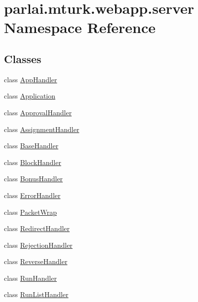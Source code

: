 \hypertarget{namespaceparlai_1_1mturk_1_1webapp_1_1server}{}\section{parlai.\+mturk.\+webapp.\+server Namespace Reference}
\label{namespaceparlai_1_1mturk_1_1webapp_1_1server}
\subsection*{Classes}
\begin{DoxyCompactItemize}
\item 
class \hyperlink{classparlai_1_1mturk_1_1webapp_1_1server_1_1AppHandler}{App\+Handler}
\item 
class \hyperlink{classparlai_1_1mturk_1_1webapp_1_1server_1_1Application}{Application}
\item 
class \hyperlink{classparlai_1_1mturk_1_1webapp_1_1server_1_1ApprovalHandler}{Approval\+Handler}
\item 
class \hyperlink{classparlai_1_1mturk_1_1webapp_1_1server_1_1AssignmentHandler}{Assignment\+Handler}
\item 
class \hyperlink{classparlai_1_1mturk_1_1webapp_1_1server_1_1BaseHandler}{Base\+Handler}
\item 
class \hyperlink{classparlai_1_1mturk_1_1webapp_1_1server_1_1BlockHandler}{Block\+Handler}
\item 
class \hyperlink{classparlai_1_1mturk_1_1webapp_1_1server_1_1BonusHandler}{Bonus\+Handler}
\item 
class \hyperlink{classparlai_1_1mturk_1_1webapp_1_1server_1_1ErrorHandler}{Error\+Handler}
\item 
class \hyperlink{classparlai_1_1mturk_1_1webapp_1_1server_1_1PacketWrap}{Packet\+Wrap}
\item 
class \hyperlink{classparlai_1_1mturk_1_1webapp_1_1server_1_1RedirectHandler}{Redirect\+Handler}
\item 
class \hyperlink{classparlai_1_1mturk_1_1webapp_1_1server_1_1RejectionHandler}{Rejection\+Handler}
\item 
class \hyperlink{classparlai_1_1mturk_1_1webapp_1_1server_1_1ReverseHandler}{Reverse\+Handler}
\item 
class \hyperlink{classparlai_1_1mturk_1_1webapp_1_1server_1_1RunHandler}{Run\+Handler}
\item 
class \hyperlink{classparlai_1_1mturk_1_1webapp_1_1server_1_1RunListHandler}{Run\+List\+Handler}

\end{DoxyCompactItemize}
